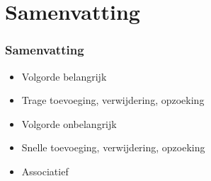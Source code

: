\section{Samenvatting}

\frame{\tableofcontents[currentsection]}

\begin{frame}
  \frametitle{Samenvatting}
  \begin{itemize}
    \item Volgorde belangrijk
    \item Trage toevoeging, verwijdering, opzoeking
  \end{itemize}
  \vskip5mm
  \begin{itemize}
    \item Volgorde onbelangrijk
    \item Snelle toevoeging, verwijdering, opzoeking
  \end{itemize}
  \vskip5mm
  \begin{itemize}
    \item Associatief
  \end{itemize}
\end{frame}